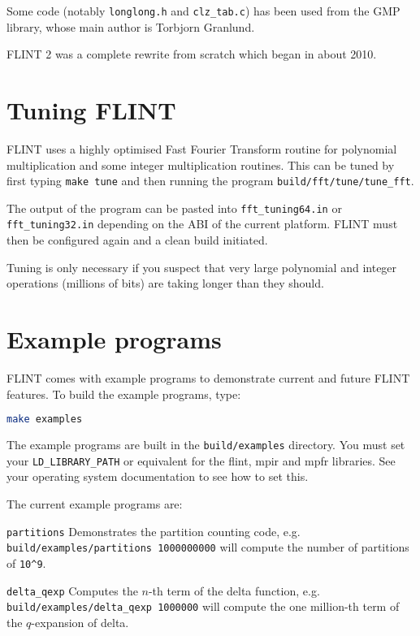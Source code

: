 \documentclass[a4paper,10pt]{book}
\newcommand{\code}{\lstinline}
\begin{document}
Some code (notably \code{longlong.h} and \code{clz_tab.c}) has been used from
the GMP library, whose main author is Torbjorn Granlund.

FLINT 2 was a complete rewrite from scratch which began in about 2010.

\chapter{Tuning FLINT}

FLINT uses a highly optimised Fast Fourier Transform routine for
polynomial multiplication and some integer multiplication routines. This
can be tuned by first typing \code{make tune} and then running the
program \code{build/fft/tune/tune_fft}.

The output of the program can be pasted into  \code{fft_tuning64.in} or
\code{fft_tuning32.in} depending on the ABI of the current platform. FLINT
must then be configured again and a clean build initiated.

Tuning is only necessary if you suspect that very large polynomial and
integer operations (millions of bits) are taking longer than they should.

\chapter{Example programs}

FLINT comes with example programs to demonstrate current and future FLINT
features.  To build the example programs, type:

\begin{lstlisting}[language=bash]
make examples
\end{lstlisting}

The example programs are built in the \code{build/examples} directory.
You must set your \code{LD_LIBRARY_PATH} or equivalent for the flint, mpir
and mpfr libraries. See your operating system documentation to see how to
set this.

The current example programs are:

\code{partitions} Demonstrates the partition counting code, e.g.\\
\code{build/examples/partitions 1000000000} will compute the number of
partitions of \code{10^9}.

\code{delta_qexp}  Computes the $n$-th term of the delta function, e.g.\\
\code{build/examples/delta_qexp 1000000} will compute the one million-th
term of the $q$-expansion of delta.
\end{document}
